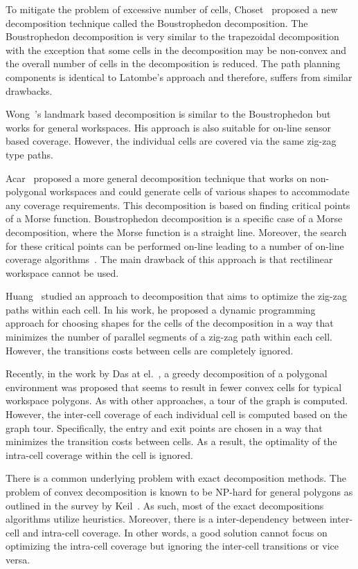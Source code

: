 \documentclass[../main.tex]{subfiles}
\begin{document}
To mitigate the problem of excessive number of cells, Choset~\cite{choset2000coverage} proposed a new decomposition technique called the Boustrophedon decomposition. The Boustrophedon decomposition is very similar to the trapezoidal decomposition with the exception that some cells in the decomposition may be non-convex and the overall number of cells in the decomposition is reduced. The path planning components is identical to Latombe's approach and therefore, suffers from similar drawbacks.

Wong~\cite{wong2004complete}'s landmark based decomposition is similar to the Boustrophedon but works for general workspaces. His approach is also suitable for on-line sensor based coverage. However, the individual cells are covered via the same zig-zag type paths.

Acar~\cite{Acar2002morse} proposed a more general decomposition technique that works on non-polygonal workspaces and could generate cells of various shapes to accommodate any coverage requirements. This decomposition is based on finding critical points of a Morse function. Boustrophedon decomposition is a specific case of a Morse decomposition, where the Morse function is a straight line. Moreover, the search for these critical points can be performed on-line leading to a number of on-line coverage algorithms~\cite{acar2002sensor}. The main drawback of this approach is that rectilinear workspace cannot be used. 

Huang~\cite{Huang2001optimal} studied an approach to decomposition that aims to optimize the zig-zag paths within each cell. In his work, he proposed a dynamic programming approach for choosing shapes for the cells of the decomposition in a way that minimizes the number of parallel segments of a zig-zag path within each cell. However, the transitions costs between cells are completely ignored.

Recently, in the work by Das at el.~\cite{das2014mapping}, a greedy decomposition of a polygonal environment was proposed that seems to result in fewer convex cells for typical workspace polygons. As with other approaches, a tour of the graph is computed. However, the inter-cell coverage of each individual cell is computed based on the graph tour. Specifically, the entry and exit points are chosen in a way that minimizes the transition costs between cells. As a result, the optimality of the intra-cell coverage within the cell is ignored.

There is a common underlying problem with exact decomposition methods. The problem of convex decomposition is known to be NP-hard for general polygons as outlined in the survey by Keil~\cite{keil2000polygon}. As such, most of the exact decompositions algorithms utilize heuristics. Moreover, there is a inter-dependency between inter-cell and intra-cell coverage. In other words, a good solution cannot focus on optimizing the intra-cell coverage but ignoring the inter-cell transitions or vice versa.
\end{document}
